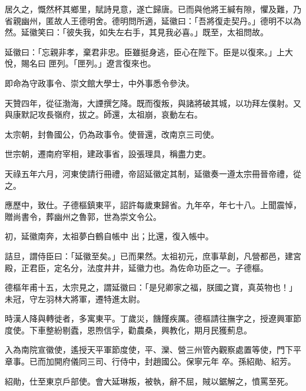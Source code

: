\begin{pinyinscope}
 居久之，慨然杯其鄉里，賦詩見意，遂亡歸唐。已而與他將王緘有隙，懼及難，乃省親幽州，匿故人王德明舍。德明問所適，延徽曰：「吾將復走契丹。」德明不以為然。延徽笑曰：「彼失我，如失左右手，其見我必喜。」既至，太祖問故。



 延徽曰：「忘親非孝，棄君非忠。臣雖挺身逃，臣心在陛下。臣是以復來。」上大悅，賜名曰
 匣列。「匣列。」遼言復來也。



 即命為守政事令、崇文館大學士，中外事悉令參決。



 天贊四年，從征渤海，大諲撰乞降。既而復叛，與諸將破其城，以功拜左僕射。又與康默記攻長嶺府，拔之。師還，太祖崩，哀動左右。



 太宗朝，封魯國公，仍為政事令。使晉還，改南京三司使。



 世宗朝，遷南府宰相，建政事省，設張理具，稱盡力吏。



 天祿五年六月，河東使請行冊禮，帝詔延徽定其制，延徽奏一遵太宗冊晉帝禮，從之。



 應歷中，致仕。子德樞鎮東平，詔許每歲東歸省。九年卒，年七十八。上聞震悼，贈尚書令，葬幽州之魯郭，世為崇文令公。



 初，延徽南奔，太祖夢白鶴自帳中
 出；比還，復入帳中。



 詰旦，謂侍臣曰：「延徽至矣。」已而果然。太祖初元，庶事草創，凡營都邑，建宮殿，正君臣，定名分，法度井井，延徽力也。為佐命功臣之一。子德樞。



 德樞年甫十五，太宗見之，謂延徽曰：「是兒卿家之福，朕國之寶，真英物也！」未冠，守左羽林大將軍，遷特進太尉。



 時漢人降與轉徙者，多寓東平。丁歲災，饑饉疾厲。德樞請往撫字之，授遼興軍節度使。下車整紛剔蠹，恩煦信孚，勸農桑，興教化，期月民獲薊息。



 入為南院宣徽使，遙授天平軍節度使，平、灤、營三州管內觀察處置等使，門下平章事。已而加開府儀同三司、行侍中，封趙國公。保寧元年
 卒。孫紹勛、紹芳。



 紹勛，仕至東京戶部使。會大延琳叛，被執，辭不屈，賊以鋸解之，憤罵至死。




\end{pinyinscope}
